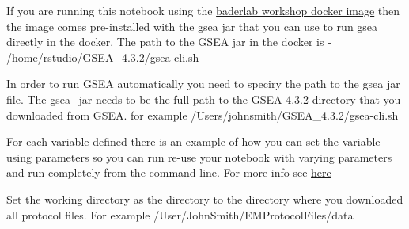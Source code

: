 \documentclass[
]{book}
\newenvironment{Shaded}{\begin{snugshade}}{\end{snugshade}}
\newcommand{\CommentTok}[1]{\textcolor[rgb]{0.56,0.35,0.01}{\textit{#1}}}
\newcommand{\NormalTok}[1]{#1}
\newcommand{\OtherTok}[1]{\textcolor[rgb]{0.56,0.35,0.01}{#1}}
\newcommand{\StringTok}[1]{\textcolor[rgb]{0.31,0.60,0.02}{#1}}
\begin{document}
If you are running this notebook using the \href{https://hub.docker.com/r/risserlin/workshop_base_image}{baderlab workshop docker image} then the image comes pre-installed with the gsea jar that you can use to run gsea directly in the docker. The path to the GSEA jar in the docker is - /home/rstudio/GSEA\_4.3.2/gsea-cli.sh

In order to run GSEA automatically you need to speciry the path to the gsea jar file.
The gsea\_jar needs to be the full path to the GSEA 4.3.2 directory that you downloaded from GSEA. for example /Users/johnsmith/GSEA\_4.3.2/gsea-cli.sh

For each variable defined there is an example of how you can set the variable using parameters so you can run re-use your notebook with varying parameters and run completely from the command line. For more info see \href{https://bookdown.org/yihui/rmarkdown/params-knit.html}{here}

\begin{Shaded}
\end{Shaded}

Set the working directory as the directory to the directory where you downloaded all protocol files. For example /User/JohnSmith/EMProtocolFiles/data
\end{document}
